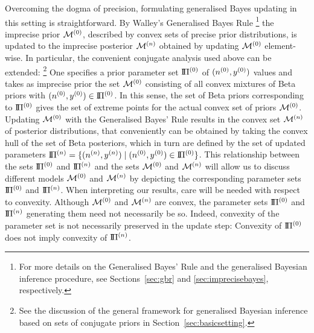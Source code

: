 Overcoming the dogma of precision, formulating generalised Bayes
updating in this setting is straightforward. By Walley's Generalised
Bayes Rule \parencite[\S 6]{1991:walley}%
\footnote{For more details on the Generalised Bayes' Rule and the generalised Bayesian inference procedure,
see Sections~\ref{sec:gbr} and \ref{sec:imprecisebayes}, respectively.}
the imprecise prior $\mathcal{M}^{(0)}$, described by convex sets of precise prior distributions,
is updated to the imprecise posterior $\mathcal{M}^{(n)}$ obtained by updating $\mathcal{M}^{(0)}$ element-wise.
In particular, the convenient conjugate analysis used above can be extended:%
\footnote{See the discussion of the general framework for generalised Bayesian inference
based on sets of conjugate priors in Section~\ref{sec:basicsetting}.}
One specifies a prior parameter set
$\text{I}\!\Pi^{(0)}$ of $(n^{(0)},y^{(0)})$ values and takes as imprecise
prior the set $\mathcal{M}^{(0)}$ consisting of  all convex mixtures of Beta
priors with $(n^{(0)}, y^{(0)}) \in \text{I}\!\Pi^{(0)}$. In this sense, the set of Beta
priors corresponding to $\text{I}\!\Pi^{(0)}$ gives the set of extreme points for
the actual convex set of priors $\mathcal{M}^{(0)}$. Updating $\mathcal{M}^{(0)}$ with the
Generalised Bayes' Rule results in the convex set $\mathcal{M}^{(n)}$ of posterior
distributions, that conveniently can be obtained by taking the
convex hull of the set of Beta posteriors, which in turn are defined
by the set of updated parameters
$\text{I}\!\Pi^{(n)} = \{(n^{(n)},y^{(n)}) \mid (n^{(0)}, y^{(0)}) \in \text{I}\!\Pi^{(0)}\}$.
This relationship between the sets $\text{I}\!\Pi^{(0)}$ and $\text{I}\!\Pi^{(n)}$ and the sets $\mathcal{M}^{(0)}$
and $\mathcal{M}^{(n)}$ will allow us to discuss different models $\mathcal{M}^{(0)}$ and $\mathcal{M}^{(n)}$ by depicting
the corresponding parameter sets $\text{I}\!\Pi^{(0)}$ and $\text{I}\!\Pi^{(n)}$. When interpreting our results,
care will be needed with respect to convexity. Although
$\mathcal{M}^{(0)}$ and $\mathcal{M}^{(n)}$ are convex, the parameter sets $\text{I}\!\Pi^{(0)}$ and $\text{I}\!\Pi^{(n)}$
generating them need not necessarily be so. %
Indeed, convexity of the parameter set is not necessarily preserved in the update
step: Convexity of $\text{I}\!\Pi^{(0)}$ does not imply convexity of $\text{I}\!\Pi^{(n)}$.


